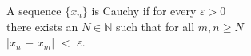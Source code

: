 \documentclass[preview]{standalone}
\begin{document}
\begin{center}
A sequence $\{x_n\}$ is Cauchy if for every $\varepsilon > 0$\\there exists an $N \in \mathbb{N}$ such that for all $m, n \geq N$\\$|$$x_n$ $-$ $x_m$$|$ $<$ $\varepsilon$.
\end{center}
\end{document}
